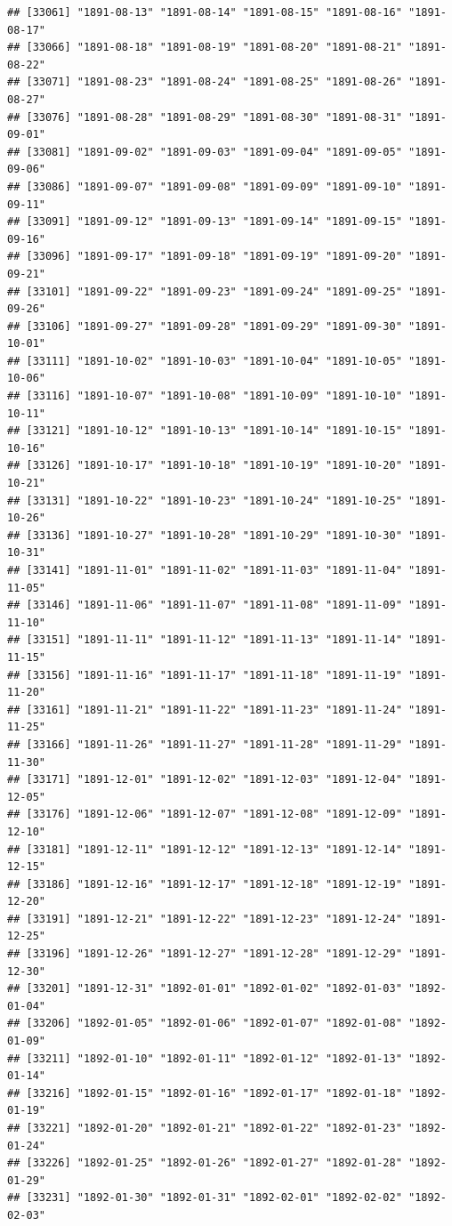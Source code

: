 \documentclass{article}\usepackage[]{graphicx}\usepackage[]{color}
\makeatletter
\newenvironment{kframe}{%
 \def\at@end@of@kframe{}%
 \ifinner\ifhmode%
  \def\at@end@of@kframe{\end{minipage}}%
  \begin{minipage}{\columnwidth}%
 \fi\fi%
 \def\FrameCommand##1{\hskip\@totalleftmargin \hskip-\fboxsep
 \colorbox{shadecolor}{##1}\hskip-\fboxsep
     \hskip-\linewidth \hskip-\@totalleftmargin \hskip\columnwidth}%
 \MakeFramed {\advance\hsize-\width
   \@totalleftmargin\z@ \linewidth\hsize
   \@setminipage}}%
 {\par\unskip\endMakeFramed%
 \at@end@of@kframe}
\newenvironment{knitrout}{}{} %
\makeatother
\begin{document}
\begin{description}
\begin{knitrout}
\begin{kframe}
\begin{verbatim}
## [33061] "1891-08-13" "1891-08-14" "1891-08-15" "1891-08-16" "1891-08-17"
## [33066] "1891-08-18" "1891-08-19" "1891-08-20" "1891-08-21" "1891-08-22"
## [33071] "1891-08-23" "1891-08-24" "1891-08-25" "1891-08-26" "1891-08-27"
## [33076] "1891-08-28" "1891-08-29" "1891-08-30" "1891-08-31" "1891-09-01"
## [33081] "1891-09-02" "1891-09-03" "1891-09-04" "1891-09-05" "1891-09-06"
## [33086] "1891-09-07" "1891-09-08" "1891-09-09" "1891-09-10" "1891-09-11"
## [33091] "1891-09-12" "1891-09-13" "1891-09-14" "1891-09-15" "1891-09-16"
## [33096] "1891-09-17" "1891-09-18" "1891-09-19" "1891-09-20" "1891-09-21"
## [33101] "1891-09-22" "1891-09-23" "1891-09-24" "1891-09-25" "1891-09-26"
## [33106] "1891-09-27" "1891-09-28" "1891-09-29" "1891-09-30" "1891-10-01"
## [33111] "1891-10-02" "1891-10-03" "1891-10-04" "1891-10-05" "1891-10-06"
## [33116] "1891-10-07" "1891-10-08" "1891-10-09" "1891-10-10" "1891-10-11"
## [33121] "1891-10-12" "1891-10-13" "1891-10-14" "1891-10-15" "1891-10-16"
## [33126] "1891-10-17" "1891-10-18" "1891-10-19" "1891-10-20" "1891-10-21"
## [33131] "1891-10-22" "1891-10-23" "1891-10-24" "1891-10-25" "1891-10-26"
## [33136] "1891-10-27" "1891-10-28" "1891-10-29" "1891-10-30" "1891-10-31"
## [33141] "1891-11-01" "1891-11-02" "1891-11-03" "1891-11-04" "1891-11-05"
## [33146] "1891-11-06" "1891-11-07" "1891-11-08" "1891-11-09" "1891-11-10"
## [33151] "1891-11-11" "1891-11-12" "1891-11-13" "1891-11-14" "1891-11-15"
## [33156] "1891-11-16" "1891-11-17" "1891-11-18" "1891-11-19" "1891-11-20"
## [33161] "1891-11-21" "1891-11-22" "1891-11-23" "1891-11-24" "1891-11-25"
## [33166] "1891-11-26" "1891-11-27" "1891-11-28" "1891-11-29" "1891-11-30"
## [33171] "1891-12-01" "1891-12-02" "1891-12-03" "1891-12-04" "1891-12-05"
## [33176] "1891-12-06" "1891-12-07" "1891-12-08" "1891-12-09" "1891-12-10"
## [33181] "1891-12-11" "1891-12-12" "1891-12-13" "1891-12-14" "1891-12-15"
## [33186] "1891-12-16" "1891-12-17" "1891-12-18" "1891-12-19" "1891-12-20"
## [33191] "1891-12-21" "1891-12-22" "1891-12-23" "1891-12-24" "1891-12-25"
## [33196] "1891-12-26" "1891-12-27" "1891-12-28" "1891-12-29" "1891-12-30"
## [33201] "1891-12-31" "1892-01-01" "1892-01-02" "1892-01-03" "1892-01-04"
## [33206] "1892-01-05" "1892-01-06" "1892-01-07" "1892-01-08" "1892-01-09"
## [33211] "1892-01-10" "1892-01-11" "1892-01-12" "1892-01-13" "1892-01-14"
## [33216] "1892-01-15" "1892-01-16" "1892-01-17" "1892-01-18" "1892-01-19"
## [33221] "1892-01-20" "1892-01-21" "1892-01-22" "1892-01-23" "1892-01-24"
## [33226] "1892-01-25" "1892-01-26" "1892-01-27" "1892-01-28" "1892-01-29"
## [33231] "1892-01-30" "1892-01-31" "1892-02-01" "1892-02-02" "1892-02-03"

\end{verbatim}
\end{kframe}
\end{knitrout}
\end{description}
\end{document}
